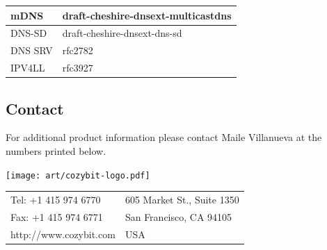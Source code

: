 \documentclass[12pt,landscape,twocolumn]{article}
\begin{document}
\vspace{1ex}
\begin{tabular}{|l|l|}
\hline
mDNS & draft-cheshire-dnsext-multicastdns \\
\hline
DNS-SD & draft-cheshire-dnsext-dns-sd \\
\hline
DNS SRV & rfc2782 \\
\hline
IPV4LL & rfc3927 \\
\hline
\end{tabular}

\subsection*{Contact}
For additional product information please contact Maile Villanueva at the
numbers printed below.

\strut{\vspace{1in}}
\begin{center}
\texttt{[image: art/cozybit-logo.pdf]}\\
\vspace{3ex}
{\scriptsize 
\begin{tabular}{l l}
Tel: +1 415 974 6770   & 605 Market St., Suite 1350 \\
Fax: +1 415 974 6771    & San Francisco, CA 94105 \\
http://www.cozybit.com  & USA \\
\end{tabular}}
\end{center}
\end{document}
